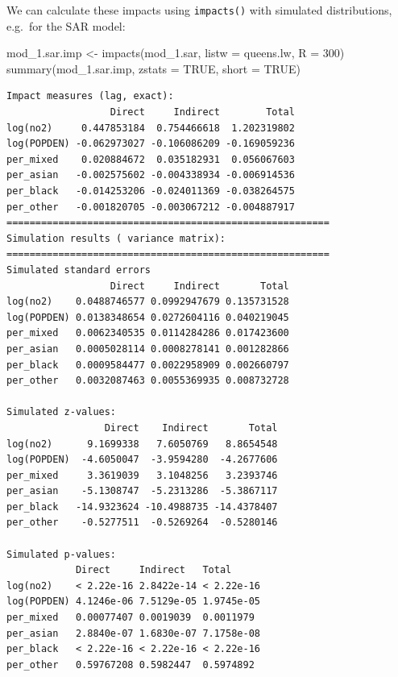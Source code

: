 \documentclass[
  letterpaper,
]{scrbook}
\newenvironment{Shaded}{\begin{snugshade}}{\end{snugshade}}
\newcommand{\AttributeTok}[1]{\textcolor[rgb]{0.40,0.45,0.13}{#1}}
\newcommand{\ConstantTok}[1]{\textcolor[rgb]{0.56,0.35,0.01}{#1}}
\newcommand{\DecValTok}[1]{\textcolor[rgb]{0.68,0.00,0.00}{#1}}
\newcommand{\FunctionTok}[1]{\textcolor[rgb]{0.28,0.35,0.67}{#1}}
\newcommand{\NormalTok}[1]{\textcolor[rgb]{0.00,0.23,0.31}{#1}}
\newcommand{\OtherTok}[1]{\textcolor[rgb]{0.00,0.23,0.31}{#1}}
\begin{document}
We can calculate these impacts using \texttt{impacts()} with simulated
distributions, e.g.~for the SAR model:

\begin{Shaded}
\begin{Highlighting}[]
\NormalTok{mod\_1.sar.imp }\OtherTok{\textless{}{-}} \FunctionTok{impacts}\NormalTok{(mod\_1.sar, }\AttributeTok{listw =}\NormalTok{ queens.lw, }\AttributeTok{R =} \DecValTok{300}\NormalTok{)}
\FunctionTok{summary}\NormalTok{(mod\_1.sar.imp, }\AttributeTok{zstats =} \ConstantTok{TRUE}\NormalTok{, }\AttributeTok{short =} \ConstantTok{TRUE}\NormalTok{)}
\end{Highlighting}
\end{Shaded}

\begin{verbatim}
Impact measures (lag, exact):
                  Direct     Indirect        Total
log(no2)     0.447853184  0.754466618  1.202319802
log(POPDEN) -0.062973027 -0.106086209 -0.169059236
per_mixed    0.020884672  0.035182931  0.056067603
per_asian   -0.002575602 -0.004338934 -0.006914536
per_black   -0.014253206 -0.024011369 -0.038264575
per_other   -0.001820705 -0.003067212 -0.004887917
========================================================
Simulation results ( variance matrix):
========================================================
Simulated standard errors
                  Direct     Indirect       Total
log(no2)    0.0488746577 0.0992947679 0.135731528
log(POPDEN) 0.0138348654 0.0272604116 0.040219045
per_mixed   0.0062340535 0.0114284286 0.017423600
per_asian   0.0005028114 0.0008278141 0.001282866
per_black   0.0009584477 0.0022958909 0.002660797
per_other   0.0032087463 0.0055369935 0.008732728

Simulated z-values:
                 Direct    Indirect       Total
log(no2)      9.1699338   7.6050769   8.8654548
log(POPDEN)  -4.6050047  -3.9594280  -4.2677606
per_mixed     3.3619039   3.1048256   3.2393746
per_asian    -5.1308747  -5.2313286  -5.3867117
per_black   -14.9323624 -10.4988735 -14.4378407
per_other    -0.5277511  -0.5269264  -0.5280146

Simulated p-values:
            Direct     Indirect   Total     
log(no2)    < 2.22e-16 2.8422e-14 < 2.22e-16
log(POPDEN) 4.1246e-06 7.5129e-05 1.9745e-05
per_mixed   0.00077407 0.0019039  0.0011979 
per_asian   2.8840e-07 1.6830e-07 7.1758e-08
per_black   < 2.22e-16 < 2.22e-16 < 2.22e-16
per_other   0.59767208 0.5982447  0.5974892 
\end{verbatim}
\end{document}
